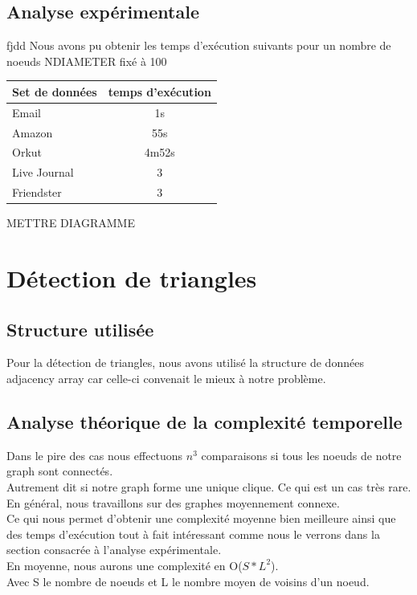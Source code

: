 \documentclass[a4paper,10pt]{report}
\begin{document}
\subsection{Analyse expérimentale}
fjdd
\newline
Nous avons pu obtenir les temps d'exécution suivants pour un nombre de noeuds NDIAMETER fixé à 100
\begin{center}
    \begin{tabular}{|l|c|}
    \hline
     Set de données & temps d'exécution\\ \hline
     Email & 1s\\ 
     Amazon & 55s\\ 
     Orkut & 4m52s \\
     Live Journal & 3\\ 
     Friendster & 3\\ 
     \hline
    \end{tabular}
\end{center}
METTRE DIAGRAMME


\section{Détection de triangles}
\subsection{Structure utilisée}
Pour la détection de triangles, nous avons utilisé la structure de données adjacency array car celle-ci convenait le mieux à notre problème.
\\
\subsection{Analyse théorique de la complexité temporelle}
Dans le pire des cas nous effectuons $n^{3}$ comparaisons si tous les noeuds de notre graph sont connectés.
\\
Autrement dit si notre graph forme une unique clique. Ce qui est un cas très rare. 
\\
En général, nous travaillons sur des graphes moyennement connexe. 
\\
Ce qui nous permet d'obtenir une complexité moyenne bien meilleure ainsi que des temps d'exécution tout à fait intéressant comme nous le verrons dans la section consacrée à l'analyse expérimentale.
\\
\newline
En moyenne, nous aurons une complexité en O(\textbf{$S*L^2$}). 
\\
Avec S le nombre de noeuds et L le nombre moyen de voisins d'un noeud.
\clearpage
\end{document}
